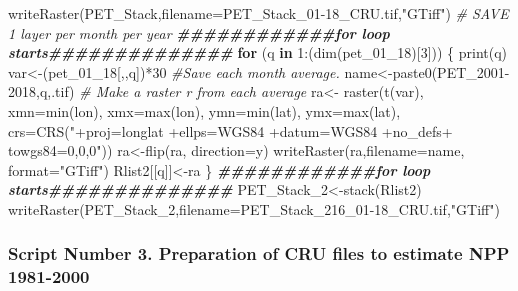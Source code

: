 \documentclass[
  10pt,
  b5paper,
]{book}
\newenvironment{Shaded}{\begin{snugshade}}{\end{snugshade}}
\newcommand{\AttributeTok}[1]{\textcolor[rgb]{0.77,0.63,0.00}{#1}}
\newcommand{\CommentTok}[1]{\textcolor[rgb]{0.56,0.35,0.01}{\textit{#1}}}
\newcommand{\ControlFlowTok}[1]{\textcolor[rgb]{0.13,0.29,0.53}{\textbf{#1}}}
\newcommand{\DecValTok}[1]{\textcolor[rgb]{0.00,0.00,0.81}{#1}}
\newcommand{\DocumentationTok}[1]{\textcolor[rgb]{0.56,0.35,0.01}{\textbf{\textit{#1}}}}
\newcommand{\FunctionTok}[1]{\textcolor[rgb]{0.00,0.00,0.00}{#1}}
\newcommand{\NormalTok}[1]{#1}
\newcommand{\OtherTok}[1]{\textcolor[rgb]{0.56,0.35,0.01}{#1}}
\newcommand{\SpecialCharTok}[1]{\textcolor[rgb]{0.00,0.00,0.00}{#1}}
\newcommand{\StringTok}[1]{\textcolor[rgb]{0.31,0.60,0.02}{#1}}
\begin{document}
\begin{Shaded}
\begin{Highlighting}[]
\FunctionTok{writeRaster}\NormalTok{(PET\_Stack,}\AttributeTok{filename=}\StringTok{\textquotesingle{}PET\_Stack\_01{-}18\_CRU.tif\textquotesingle{}}\NormalTok{,}\StringTok{"GTiff"}\NormalTok{)}
 \CommentTok{\# SAVE 1 layer per month per year}
\DocumentationTok{\#\#\#\#\#\#\#\#\#\#\#\#for loop starts\#\#\#\#\#\#\#\#\#\#\#\#\#\#}
 \ControlFlowTok{for}\NormalTok{ (q }\ControlFlowTok{in} \DecValTok{1}\SpecialCharTok{:}\NormalTok{(}\FunctionTok{dim}\NormalTok{(pet\_01\_18)[}\DecValTok{3}\NormalTok{])) \{}
\FunctionTok{print}\NormalTok{(q)}
\NormalTok{var}\OtherTok{\textless{}{-}}\NormalTok{(pet\_01\_18[,,q])}\SpecialCharTok{*}\DecValTok{30}
 \CommentTok{\#Save each month average. }
\NormalTok{ name}\OtherTok{\textless{}{-}}\FunctionTok{paste0}\NormalTok{(}\StringTok{\textquotesingle{}PET\_2001{-}2018\textquotesingle{}}\NormalTok{,q,}\StringTok{\textquotesingle{}.tif\textquotesingle{}}\NormalTok{)}
 \CommentTok{\# Make a raster r from each average}
\NormalTok{ra}\OtherTok{\textless{}{-}} \FunctionTok{raster}\NormalTok{(}\FunctionTok{t}\NormalTok{(var), }\AttributeTok{xmn=}\FunctionTok{min}\NormalTok{(lon), }\AttributeTok{xmx=}\FunctionTok{max}\NormalTok{(lon), }\AttributeTok{ymn=}\FunctionTok{min}\NormalTok{(lat), }\AttributeTok{ymx=}\FunctionTok{max}\NormalTok{(lat), }\AttributeTok{crs=}\FunctionTok{CRS}\NormalTok{(}\StringTok{"+proj=longlat +ellps=WGS84 +datum=WGS84 +no\_defs+ towgs84=0,0,0"}\NormalTok{))}
\NormalTok{ra}\OtherTok{\textless{}{-}}\FunctionTok{flip}\NormalTok{(ra, }\AttributeTok{direction=}\StringTok{\textquotesingle{}y\textquotesingle{}}\NormalTok{)}
\FunctionTok{writeRaster}\NormalTok{(ra,}\AttributeTok{filename=}\NormalTok{name, }\AttributeTok{format=}\StringTok{"GTiff"}\NormalTok{)}
\NormalTok{Rlist2[[q]]}\OtherTok{\textless{}{-}}\NormalTok{ra}
\NormalTok{\}}
\DocumentationTok{\#\#\#\#\#\#\#\#\#\#\#\#for loop starts\#\#\#\#\#\#\#\#\#\#\#\#\#\#}
\NormalTok{PET\_Stack\_2}\OtherTok{\textless{}{-}}\FunctionTok{stack}\NormalTok{(Rlist2)}
\FunctionTok{writeRaster}\NormalTok{(PET\_Stack\_2,}\AttributeTok{filename=}\StringTok{\textquotesingle{}PET\_Stack\_216\_01{-}18\_CRU.tif\textquotesingle{}}\NormalTok{,}\StringTok{"GTiff"}\NormalTok{) }
\end{Highlighting}
\end{Shaded}

\hypertarget{script-number-3.-preparation-of-cru-files-to-estimate-npp-1981-2000}{%
\subsubsection{Script Number 3. Preparation of CRU files to estimate NPP 1981-2000}\label{script-number-3.-preparation-of-cru-files-to-estimate-npp-1981-2000}}
\end{document}
